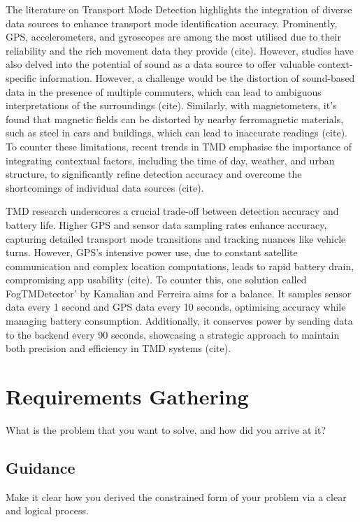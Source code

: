 \documentclass{l4proj}
\begin{document}
The literature on Transport Mode Detection highlights the integration of diverse data sources to enhance transport mode identification accuracy. Prominently, GPS, accelerometers, and gyroscopes are among the most utilised due to their reliability and the rich movement data they provide (cite). However, studies have also delved into the potential of sound as a data source to offer valuable context-specific information. However, a challenge would be the distortion of sound-based data in the presence of multiple commuters, which can lead to ambiguous interpretations of the surroundings (cite). Similarly, with magnetometers, it's found that magnetic fields can be distorted by nearby ferromagnetic materials, such as steel in cars and buildings, which can lead to inaccurate readings (cite). To counter these limitations, recent trends in TMD emphasise the importance of integrating contextual factors, including the time of day, weather, and urban structure, to significantly refine detection accuracy and overcome the shortcomings of individual data sources (cite).

TMD research underscores a crucial trade-off between detection accuracy and battery life. Higher GPS and sensor data sampling rates enhance accuracy, capturing detailed transport mode transitions and tracking nuances like vehicle turns. However, GPS's intensive power use, due to constant satellite communication and complex location computations, leads to rapid battery drain, compromising app usability (cite). To counter this, one solution called FogTMDetector' by Kamalian and Ferreira aims for a balance. It samples sensor data every 1 second and GPS data every 10 seconds, optimising accuracy while managing battery consumption. Additionally, it conserves power by sending data to the backend every 90 seconds, showcasing a strategic approach to maintain both precision and efficiency in TMD systems (cite).


\chapter{Requirements Gathering}
What is the problem that you want to solve, and how did you arrive at it?
\section{Guidance}
Make it clear how you derived the constrained form of your problem via a clear and logical process. 
\end{document}
